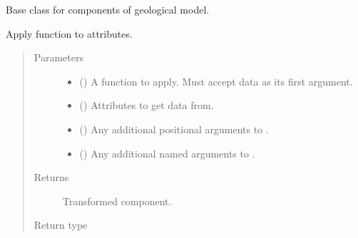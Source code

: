 \documentclass[letterpaper,10pt,english]{sphinxmanual}
\begin{document}
\begin{fulllineitems}
\label{\detokenize{api/base_classes:geology.src.base_component.BaseComponent}}
Base class for components of geological model.

\begin{fulllineitems}
\label{\detokenize{api/base_classes:geology.src.base_component.BaseComponent.apply}}
Apply function to attributes.
\begin{quote}\begin{description}
\item[{Parameters}] \leavevmode\begin{itemize}
\item {} 
 () \textendash{} A function to apply. Must accept data as its first argument.

\item {} 
 (\sphinxstyleliteralemphasis{\sphinxupquote{, }}) \textendash{} Attributes to get data from.

\item {} 
 () \textendash{} Any additional positional arguments to .

\item {} 
 () \textendash{} Any additional named arguments to .

\end{itemize}

\item[{Returns}] \leavevmode
{} \textendash{} Transformed component.

\item[{Return type}] \leavevmode
{\hyperref[\detokenize{api/base_classes:geology.src.base_component.BaseComponent}]{}}


\end{description}
\end{quote}
\end{fulllineitems}
\end{fulllineitems}
\end{document}
